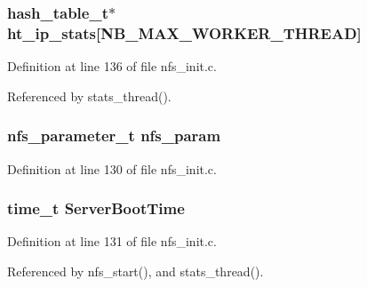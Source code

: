 \subsubsection{\setlength{\rightskip}{0pt plus 5cm}hash\_\-table\_\-t$\ast$ {\bf ht\_\-ip\_\-stats}[NB\_\-MAX\_\-WORKER\_\-THREAD]}\label{nfs__stats__thread_8c_a2}




Definition at line 136 of file nfs\_\-init.c.

Referenced by stats\_\-thread().
\subsubsection{\setlength{\rightskip}{0pt plus 5cm}nfs\_\-parameter\_\-t {\bf nfs\_\-param}}\label{nfs__stats__thread_8c_a0}




Definition at line 130 of file nfs\_\-init.c.
\subsubsection{\setlength{\rightskip}{0pt plus 5cm}time\_\-t {\bf Server\-Boot\-Time}}\label{nfs__stats__thread_8c_a1}




Definition at line 131 of file nfs\_\-init.c.

Referenced by nfs\_\-start(), and stats\_\-thread().